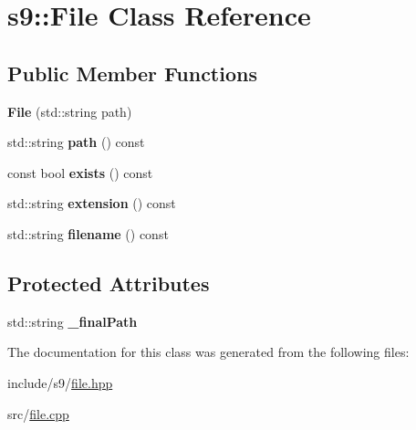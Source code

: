\hypertarget{classs9_1_1File}{\section{s9\-:\-:File Class Reference}
\label{classs9_1_1File}
}
\subsection*{Public Member Functions}
\begin{DoxyCompactItemize}
\item 
\hypertarget{classs9_1_1File_a4901fbf2e6cebd0adea4ea0cf998530f}{{\bfseries File} (std\-::string path)}\label{classs9_1_1File_a4901fbf2e6cebd0adea4ea0cf998530f}

\item 
\hypertarget{classs9_1_1File_a790a68737993d4bf74f1f2ea6fb20c6f}{std\-::string {\bfseries path} () const }\label{classs9_1_1File_a790a68737993d4bf74f1f2ea6fb20c6f}

\item 
\hypertarget{classs9_1_1File_a41104d6cac0537b05129614fc9ead481}{const bool {\bfseries exists} () const }\label{classs9_1_1File_a41104d6cac0537b05129614fc9ead481}

\item 
\hypertarget{classs9_1_1File_ac6a98e3f3076eebfa23c6e5ef0864b10}{std\-::string {\bfseries extension} () const }\label{classs9_1_1File_ac6a98e3f3076eebfa23c6e5ef0864b10}

\item 
\hypertarget{classs9_1_1File_aa225d57e4cd07d1b1178a00ff24797b2}{std\-::string {\bfseries filename} () const }\label{classs9_1_1File_aa225d57e4cd07d1b1178a00ff24797b2}

\end{DoxyCompactItemize}
\subsection*{Protected Attributes}
\begin{DoxyCompactItemize}
\item 
\hypertarget{classs9_1_1File_ab7a13e2f6ee59e974ff7b192dd6ea188}{std\-::string {\bfseries \-\_\-final\-Path}}\label{classs9_1_1File_ab7a13e2f6ee59e974ff7b192dd6ea188}

\end{DoxyCompactItemize}


The documentation for this class was generated from the following files\-:\begin{DoxyCompactItemize}
\item 
include/s9/\hyperlink{file_8hpp}{file.\-hpp}\item 
src/\hyperlink{file_8cpp}{file.\-cpp}\end{DoxyCompactItemize}
